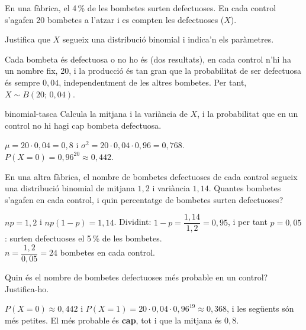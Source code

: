En una fàbrica, el 4\,\% de les bombetes surten defectuoses. En cada control s'agafen 20 bombetes a l'atzar
i es compten les defectuoses ($X$).

\begin{apartats}

Justifica que $X$ segueix una distribució binomial i indica'n els paràmetres.

\begin{solucio}
Cada bombeta és defectuosa o no ho és (dos resultats), en cada control n'hi ha un nombre fix, 20, i la
producció és tan gran que la probabilitat de ser defectuosa és sempre $0{,}04$, independentment de les
altres bombetes. Per tant, $X\sim B(20;\,0{,}04)$.
\end{solucio}

\begin{tria}{binomial-tasca}
Calcula la mitjana i la variància de $X$, i la probabilitat que en un control no hi hagi cap bombeta
defectuosa.

\begin{solucio}
$\mu=20\cdot0{,}04=0{,}8$ i $\sigma^2=20\cdot0{,}04\cdot0{,}96=0{,}768$.\\
$P(X=0)=0{,}96^{20}\approx0{,}442$.
\end{solucio}

En una altra fàbrica, el nombre de bombetes defectuoses de cada control segueix una distribució binomial
de mitjana $1{,}2$ i variància $1{,}14$. Quantes bombetes s'agafen en cada control, i quin percentatge de
bombetes surten defectuoses?

\begin{solucio}
$np=1{,}2$ i $np(1-p)=1{,}14$. Dividint: $1-p=\dfrac{1{,}14}{1{,}2}=0{,}95$, i per tant $p=0{,}05$: surten
defectuoses el 5\,\% de les bombetes.\\
$n=\dfrac{1{,}2}{0{,}05}=24$ bombetes en cada control.
\end{solucio}
\end{tria}

\begin{nomesllarg}
Quin és el nombre de bombetes defectuoses més probable en un control? Justifica-ho.

\begin{solucio}
$P(X=0)\approx0{,}442$ i $P(X=1)=20\cdot0{,}04\cdot0{,}96^{19}\approx0{,}368$, i les següents són més
petites. El més probable és \textbf{cap}, tot i que la mitjana és $0{,}8$.
\end{solucio}
\end{nomesllarg}

\end{apartats}
